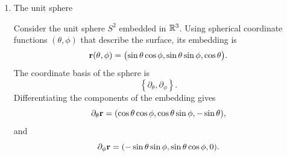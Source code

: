 \begin{enumerate}[(1)]
				Once again, we refer to the component representations 
				in the same way as elementary vector physics.
				Thus, the coordinate basis vectors have the ambient
				representations
				\[
					\partial_r = \vb{e}_r
					=
					\pqty{
						\cos\theta,
						\sin\theta
					},
					\qquad
					\partial_\theta = \vb{e}_\theta
					=
					\pqty{
						-r\sin\theta,
						r\cos\theta
					}.
				\]

				An arbitrary tangent vector is
				\[
					V
					=
					V^r\partial_r
					+
					V^\theta\partial_\theta.
				\]
				Therefore, its ambient Cartesian components are
				\[
					V
					=
					V^r
					\pqty{
						\cos\theta,
						\sin\theta
					}
					+
					V^\theta
					\pqty{
						-r\sin\theta,
						r\cos\theta
					}.
				\]
				Combining the components gives
				\[
					V
					=
					\pqty{
						V^r\cos\theta
						-
						rV^\theta\sin\theta,
						\,
						V^r\sin\theta
						+
						rV^\theta\cos\theta
					}.
				\]

				Thus, the vector has two independent components, $V^r$ and
				$V^\theta$, corresponding to the two intrinsic directions of
				the manifold. Its representation in the ambient Cartesian
				space also has two components, but these are related to
				$V^r$ and $V^\theta$ through the coordinate transformation.

			\item The unit sphere

				Consider the unit sphere $S^2$ embedded in $\mathbb{R}^3$. Using spherical
				coordinate functions $(\theta,\phi)$ that describe the surface,
				its embedding is
				\[
					\vb{r}(\theta,\phi)
					=
					\bigl(
						\sin\theta\cos\phi,
						\sin\theta\sin\phi,
						\cos\theta
					\bigr).
				\]
				The coordinate basis of the sphere is
				\[
					\left\{
						\partial_\theta,\partial_\phi
					\right\}.
				\]
				Differentiating the components of the embedding gives
				\[
					\partial_\theta\vb{r}
					=
					\pqty{
						\cos\theta\cos\phi,
						\cos\theta\sin\phi,
						-\sin\theta
					},
				\]
				and
				\[
					\partial_\phi\vb{r}
					=
					\pqty{
						-\sin\theta\sin\phi,
						\sin\theta\cos\phi,
						0
					}.
				\]


\end{enumerate}
